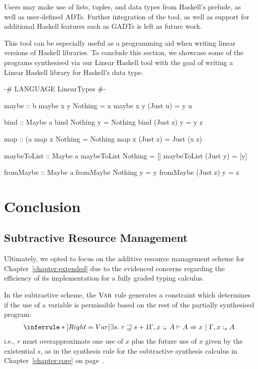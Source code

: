 Users may make use of lists, tuples,  and  data
types from Haskell's prelude, as well as user-defined ADTs. Further integration
of the tool, as well as support for additional Haskell features such as GADTs is
left as future work.

This tool can be especially useful as a programming aid when writing linear
versions of Haskell libraries. To conclude this section, we showcase some of the
programs synthesised via our Linear Haskell tool with the goal of writing a
Linear Haskell library for Haskell's  data type. 

\vspace{1em}
\begin{haskell}
{-# LANGUAGE LinearTypes #-}

maybe :: b %
maybe x y Nothing = x
maybe x y (Just u) = y u

bind :: Maybe a %
bind Nothing y = Nothing
bind (Just z) y = y z

map :: (a %
map x Nothing = Nothing
map x (Just z) = Just (x z)

maybeToList :: Maybe a %
maybeToList Nothing = []
maybeToList (Just y) = [y]

fromMaybe :: Maybe a %
fromMaybe Nothing y = y
fromMaybe (Just z) y = z

\end{haskell}


\section{Conclusion}
\label{section:graded-base-conclusion}

\subsection{Subtractive Resource Management}
Ultimately, we opted to focus on the additive resource management scheme for
Chapter~\ref{chapter:extended} due to the evidenced concerns regarding the
efficiency of its implementation for a fully graded typing calculus.

In the subtractive scheme, the $\textsc{Var}$ rule generates a constraint which
determines if the use of a variable is permissible based on the rest of the
partially synthesised program:
\begin{align*}
  \inferrule*[Right=Var]
  {\exists s .\ r \sqsupseteq s + 1}
  {\Gamma, x :_{r} A \vdash A \Rightarrow x\ |\ \Gamma, x :_{s} A}
\end{align*}
i.e., $r$ must overapproximate one use of $x$ plus the future use of
$x$ given by the existential $s$, as in the synthesis rule for the subtractive
synthesis calculus in Chapter~\ref{chapter:core} on page~\pageref{sub:grVar}.

